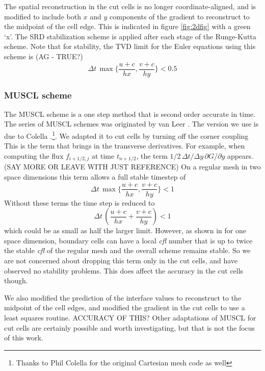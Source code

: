 The spatial reconstruction in the cut cells is no longer
coordinate-aligned, and is modified
to include both $x$ and $y$ components of the gradient to 
reconstruct to the midpoint of the cell edge. This is indicated 
in figure \ref{fig:2dfig}  with a green `x'.
The SRD stabilization scheme is applied after each stage of
the Runge-Kutta scheme. 
Note that for stability, the TVD limit for the Euler equations using
this scheme is  (AG -
TRUE?)
\begin{equation}
\Delta t \,  \max\{\frac{u+c}{hx},\frac{v+c}{hy}\} < 0.5 
\end{equation}


\subsubsection{MUSCL scheme}
The MUSCL scheme is a one step method that is second order accurate in
time. The series of MUSCL schemes  was originated by van Leer 
\cite{vanleer:muscl}. The version we use 
is due to Colella \cite{Colella:Unsplit}.\footnote{Thanks to Phil 
Colella for the original Cartesian mesh code as well}.
We adapted it to cut cells by turning off the corner coupling 
This is the term that brings in the transverse derivatives. For example,
when computing the flux $f_{i+1/2,j}$ at time $t_{n+1/2}$, the 
term $ 1/2 \, \Delta t/\Delta y \, \partial G / \partial y$
appears.
(SAY MORE OR LEAVE WITH JUST REFERENCE)
On a regular mesh in  two space dimensions this term allows a
full stable timestep of 
\begin{equation}
\Delta t \,  \max\{\frac{u+c}{hx},\frac{v+c}{hy}\} < 1
\end{equation}
Without these terms the time step is reduced to 
\begin{equation}
\Delta t \, \left (\frac{u+c}{hx} + \frac{v+c}{hy} \right) < 1
\end{equation}
which could be as small as half the larger limit.
However, as shown in \cite{mjb:stability2} for one space dimension, 
boundary cells can have
a local {\em cfl} number that is up to twice the stable {\em cfl} of the regular
mesh and the overall scheme remains stable. So we are not concerned
about dropping this term only in the cut cells, and have observed no
stability problems. This does affect the accuracy in the cut cells
though. 

We also modified the prediction of the interface values to reconstruct
to the midpoint of the cell edges, and
modified the gradient in the cut cells to use a least squares routine.
ACCURACY OF THIS?
Other adaptations of MUSCL for cut cells are certainly possible and
worth investigating, but that is not the focus of this work.


